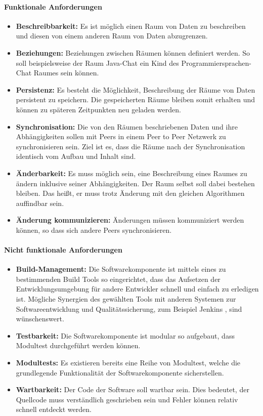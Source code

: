 \documentclass[a4paper]{article}
\begin{document}
	\paragraph{Funktionale Anforderungen}
	\begin{itemize}
		\item \textbf{Beschreibbarkeit:} Es ist möglich einen Raum von
		Daten zu beschreiben und diesen von einem anderen Raum
		von Daten abzugrenzen. 
		\item \textbf{Beziehungen:} Beziehungen zwischen Räumen können 
		definiert werden. So soll beispielsweise der Raum Java-Chat ein 
		Kind des Programmiersprachen-Chat Raumes sein können.
		\item \textbf{Persistenz:} Es besteht die Möglichkeit, Beschreibung der
		Räume von Daten persistent zu speichern. Die gespeicherten Räume
		bleiben somit erhalten und können zu späteren Zeitpunkten neu
		geladen werden.
		\item \textbf{Synchronisation:} Die von den Räumen beschriebenen Daten 
		und ihre Abhängigkeiten sollen mit Peers in einem Peer to Peer Netzwerk 
		zu synchronisieren sein. Ziel ist es, dass die Räume nach der 
		Synchronisation identisch vom Aufbau und Inhalt sind.
		\item \textbf{Änderbarkeit:} Es muss möglich sein, eine Beschreibung
		eines Raumes zu ändern inklusive seiner Abhängigkeiten. Der Raum
		selbst soll dabei bestehen bleiben. Das heißt, er muss trotz Änderung
		mit den gleichen Algorithmen auffindbar sein.
		\item \textbf{Änderung kommunizieren:} Änderungen müssen
		kommuniziert werden können, so dass sich andere Peers synchronisieren.
	\end{itemize} 	
	
	\paragraph{Nicht funktionale Anforderungen}
	\begin{itemize}
		\item \textbf{Build-Management:} Die Softwarekomponente ist mittels
		eines zu bestimmenden Build Tools so eingerichtet, dass das Aufsetzen 
		der	Entwicklungsumgebung für andere Entwickler schnell und einfach
		zu erledigen ist. Mögliche Synergien des gewählten Tools mit anderen
		Systemen zur Softwareentwicklung und Qualitätssicherung, zum Beispiel  
		Jenkins \cite{Jenkins}, sind wünschenswert.
		\item \textbf{Testbarkeit:} Die Softwarekomponente
		ist modular so aufgebaut, dass Modultest durchgeführt werden können.
		\item \textbf{Modultests:} Es existieren bereits eine Reihe von
		Modultest, welche die grundlegende Funktionalität der 
		Softwarekomponente sicherstellen.
		\item \textbf{Wartbarkeit:} Der Code der Software soll wartbar sein.
		Dies bedeutet, der Quellcode muss verständlich geschrieben sein und Fehler
		können relativ schnell entdeckt werden.
	\end{itemize} 
	
\end{document}
